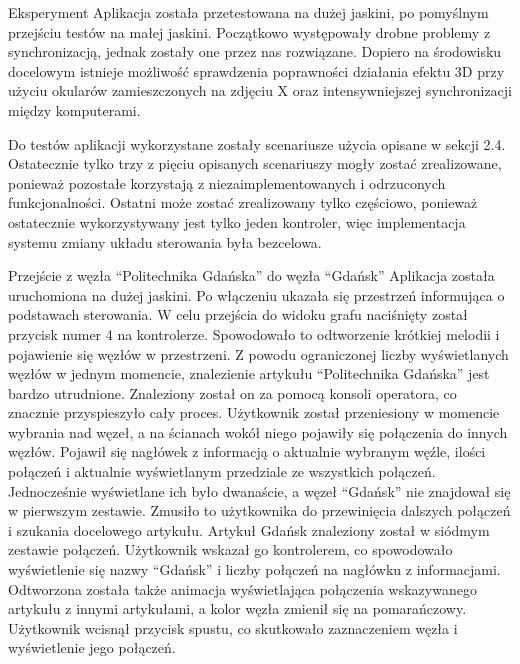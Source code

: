 \begin{chapter}{Eksperyment}
	\newcommand{\chapterPath}{rozdzialy/6_eksperyment}	
Aplikacja została przetestowana na dużej jaskini, po pomyślnym przejściu testów na małej jaskini. Początkowo występowały drobne problemy z synchronizacją, jednak zostały one przez nas rozwiązane. Dopiero na środowisku docelowym istnieje możliwość sprawdzenia poprawności działania efektu 3D przy użyciu okularów zamieszczonych na zdjęciu X oraz intensywniejszej synchronizacji między komputerami. 

Do testów aplikacji wykorzystane zostały scenariusze użycia opisane w sekcji 2.4. Ostatecznie tylko trzy z pięciu opisanych scenariuszy mogły zostać zrealizowane, ponieważ pozostałe korzystają z niezaimplementowanych i odrzuconych funkcjonalności. Ostatni może zostać zrealizowany tylko częściowo, ponieważ ostatecznie wykorzystywany jest tylko jeden kontroler, więc implementacja systemu zmiany układu sterowania była bezcelowa.

Przejście z węzła “Politechnika Gdańska” do węzła “Gdańsk” 
Aplikacja została uruchomiona na dużej jaskini. Po włączeniu ukazała się przestrzeń informująca o podstawach sterowania. W celu przejścia do widoku grafu naciśnięty został przycisk numer 4 na kontrolerze. Spowodowało to odtworzenie krótkiej melodii i pojawienie się węzłów w przestrzeni. Z powodu ograniczonej liczby wyświetlanych węzłów w jednym momencie, znalezienie artykułu “Politechnika Gdańska” jest bardzo utrudnione. Znaleziony został on za pomocą konsoli operatora, co znacznie przyspieszyło cały proces. Użytkownik został przeniesiony w momencie wybrania nad węzeł, a na ścianach wokół niego pojawiły się połączenia do innych węzłów. Pojawił się nagłówek z informacją o aktualnie wybranym węźle, ilości połączeń i aktualnie wyświetlanym przedziale ze wszystkich połączeń. Jednocześnie wyświetlane ich było dwanaście, a węzeł “Gdańsk” nie znajdował się w pierwszym zestawie. Zmusiło to użytkownika do przewinięcia dalszych połączeń i szukania docelowego artykułu. Artykuł Gdańsk znaleziony został w siódmym zestawie połączeń. Użytkownik wskazał go kontrolerem, co spowodowało wyświetlenie się nazwy “Gdańsk” i liczby połączeń na nagłówku z informacjami. Odtworzona została także animacja wyświetlająca połączenia wskazywanego artykułu z innymi artykułami, a kolor węzła zmienił się na pomarańczowy. Użytkownik wcisnął przycisk spustu, co skutkowało zaznaczeniem węzła i wyświetlenie jego połączeń.


\end{chapter}
